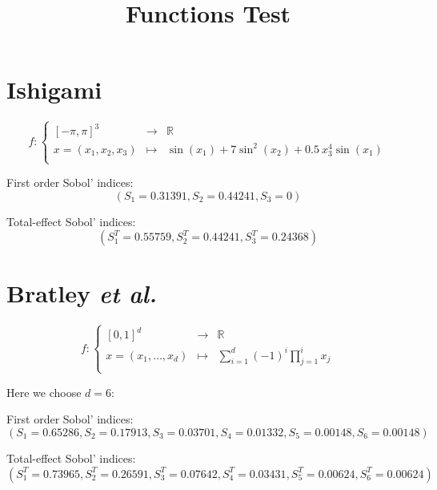 \documentclass[10pt,a4paper]{article}
\begin{document}
\title{Functions Test}
\date{}
\maketitle

\section*{Ishigami}

\bigskip

\begin{equation*}
f \colon \left\lbrace \begin{array}{ccccc}
 [-\pi,\pi]^3 & \to & \mathbb{R} \\
  x=(x_1,x_2,x_3) & \mapsto &  \sin(x_1)+7  \sin^2(x_2)+0.5 \ x_3^4 \sin(x_1)\\
\end{array} \right.
\end{equation*}

\bigskip

First order Sobol' indices: $$(S_1=0.31391, S_2=0.44241, S_3=0)$$

\bigskip

Total-effect Sobol' indices: $$(S_1^T=0.55759, S_2^T=0.44241, S_3^T=0.24368)$$

\bigskip

\section*{Bratley \it{et al.}}

\bigskip

\begin{equation*}
f \colon \left\lbrace \begin{array}{ccccc}
 [0,1]^d & \to & \mathbb{R} \\
  x=(x_1,\dots,x_d) & \mapsto &  \sum \limits_{i=1}^d (-1)^i \prod \limits_{j=1}^i x_j \\
\end{array} \right.
\end{equation*}

\bigskip

Here we choose $d=6$:

\bigskip

First order Sobol' indices: $$(S_1=0.65286, S_2=0.17913, S_3=0.03701, S_4=0.01332, S_5=0.00148, S_6=0.00148)$$

\bigskip

Total-effect Sobol' indices: $$(S_1^T=0.73965,S_2^T=0.26591, S_3^T=0.07642, S_4^T=0.03431, S_5^T=0.00624, S_6^T=0.00624)$$
\end{document}
